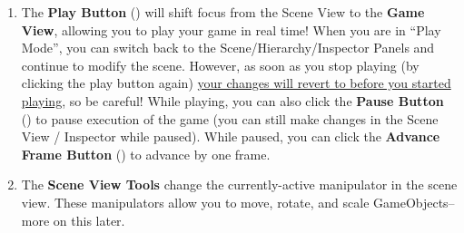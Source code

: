 \documentclass[11pt]{article}
\begin{document}
\begin{enumerate}
    \item The \textbf{Play Button} (\faPlay) will shift focus from the Scene View to the \textbf{Game View}, allowing you to play your game in real time!  When you are in ``Play Mode'', you can switch back to the Scene/Hierarchy/Inspector Panels and continue to modify the scene.  However, as soon as you stop playing (by clicking the play button again) \underline{your changes will revert to before you started playing}, so be careful!  While playing, you can also click the \textbf{Pause Button} (\faPause) to pause execution of the game (you can still make changes in the Scene View / Inspector while paused).  While paused, you can click the \textbf{Advance Frame Button} (\faFastForward) to advance by one frame.
    \item The \textbf{Scene View Tools} change the currently-active manipulator in the scene view.  These manipulators allow you to move, rotate, and scale GameObjects--more on this later.
\end{enumerate}
\end{document}
